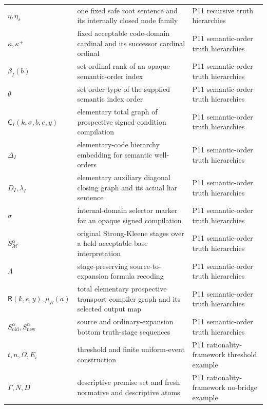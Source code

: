 \begin{longtable}{@{}p{}p{}p{}@{}}
\(\eta,\allowbreak \eta_s\) & one fixed safe root sentence and its internally closed node family & P11 recursive truth hierarchies \\
\(\kappa,\allowbreak \kappa^+\) & fixed acceptable code-domain cardinal and its successor cardinal ordinal & P11 semantic-\allowbreak{}order truth hierarchies \\
\(\beta_I(b)\) & set-ordinal rank of an opaque semantic-order index & P11 semantic-\allowbreak{}order truth hierarchies \\
\(\theta\) & set order type of the supplied semantic index order & P11 semantic-\allowbreak{}order truth hierarchies \\
\(\mathsf C_I(k,\allowbreak \sigma,\allowbreak b,\allowbreak e,\allowbreak y)\) & elementary total graph of prospective signed condition compilation & P11 semantic-\allowbreak{}order truth hierarchies \\
\(\Delta_I\) & elementary-code hierarchy embedding for semantic well-orders & P11 semantic-\allowbreak{}order truth hierarchies \\
\(D_I,\allowbreak \lambda_I\) & elementary auxiliary diagonal closing graph and its actual liar sentence & P11 semantic-\allowbreak{}order truth hierarchies \\
\(\sigma\) & internal-domain selector marker for an opaque signed compilation & P11 semantic-\allowbreak{}order truth hierarchies \\
\(S_{\mathcal M}^{\alpha}\) & original Strong-Kleene stages over a held acceptable-base interpretation & P11 semantic-\allowbreak{}order truth hierarchies \\
\(\Lambda\) & stage-preserving source-to-expansion formula recoding & P11 semantic-\allowbreak{}order truth hierarchies \\
\(\mathsf R(k,\allowbreak e,\allowbreak y),\allowbreak \mu_R(a)\) & total elementary prospective transport compiler graph and its selected output map & P11 semantic-\allowbreak{}order truth hierarchies \\
\(S^{\alpha}_{\mathrm{old}},\allowbreak S^{\alpha}_{\mathrm{new}}\) & source and ordinary-expansion bottom truth-stage sequences & P11 semantic-\allowbreak{}order truth hierarchies \\
\(t,\allowbreak n,\allowbreak \Omega,\allowbreak E_i\) & threshold and finite uniform-event construction & P11 rationality-\allowbreak{}framework threshold example \\
\(\Gamma,\allowbreak N,\allowbreak D\) & descriptive premise set and fresh normative and descriptive atoms & P11 rationality-\allowbreak{}framework no-\allowbreak{}bridge example \\

\end{longtable}
